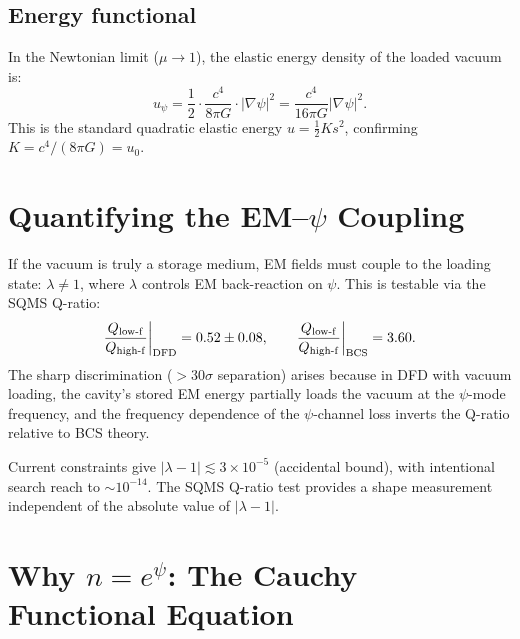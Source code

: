 \documentclass[aps,prd,twocolumn,superscriptaddress,nofootinbib]{revtex4-2}
\begin{document}
\subsection{Energy functional}

In the Newtonian limit ($\mu \to 1$), the elastic energy density of
the loaded vacuum is:
\begin{equation}
u_\psi = \frac{1}{2}\cdot\frac{c^4}{8\pi G}\cdot|\nabla\psi|^2
= \frac{c^4}{16\pi G}|\nabla\psi|^2.
\label{eq:energy-density}
\end{equation}
This is the standard quadratic elastic energy
$u = \frac{1}{2}K s^2$, confirming $K = c^4/(8\pi G) = u_0$.


\section{Quantifying the EM--$\psi$ Coupling}
\label{sec:em-coupling}

If the vacuum is truly a storage medium, EM fields must couple to the
loading state: $\lambda \neq 1$, where $\lambda$ controls EM
back-reaction on $\psi$.  This is testable via the SQMS Q-ratio:
\begin{equation}
\frac{Q_{\rm low\text{-}f}}{Q_{\rm high\text{-}f}}\bigg|_{\rm DFD}
= 0.52 \pm 0.08,
\qquad
\frac{Q_{\rm low\text{-}f}}{Q_{\rm high\text{-}f}}\bigg|_{\rm BCS}
= 3.60.
\label{eq:Q-ratio}
\end{equation}
The sharp discrimination ($>30\sigma$ separation) arises because in
DFD with vacuum loading, the cavity's stored EM energy partially loads
the vacuum at the $\psi$-mode frequency, and the frequency dependence
of the $\psi$-channel loss inverts the Q-ratio relative to BCS theory.

Current constraints give
$|\lambda - 1| \lesssim 3 \times 10^{-5}$ (accidental bound),
with intentional search reach to $\sim 10^{-14}$.  The SQMS Q-ratio
test provides a shape measurement independent of the absolute value
of $|\lambda - 1|$.


\section{Why $n = e^\psi$: The Cauchy Functional Equation}
\label{sec:exponential}
\end{document}
